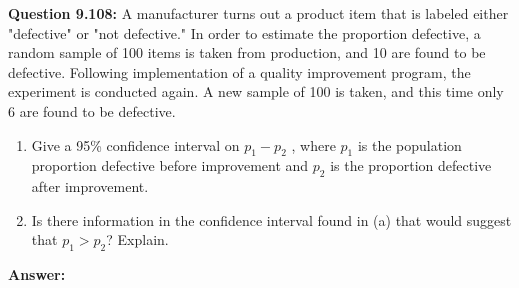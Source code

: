 \documentclass{article}
\begin{document}
\textbf{Question 9.108:}
A manufacturer turns out a product item that
is labeled either "defective" or "not defective." In order
to estimate the proportion defective, a random sample 
of 100 items is taken from production, and 10 are
found to be defective. Following implementation of a
quality improvement program, the experiment is 
conducted again. A new sample of 100 is taken, and this
time only 6 are found to be defective.
\begin{enumerate}[label = (\alph*) ]
    \item Give a 95\% confidence interval on $p_1 − p_2$ , 
    where $p_1$ is the population proportion defective before 
    improvement and $p_2$ is the proportion defective after
    improvement.
    \item Is there information in the confidence interval
    found in (a) that would suggest that $p_1 > p_2$? 
    Explain.
\end{enumerate}
\begin{description}
    \item \textbf{Answer:} 
\end{description}
\end{document}
